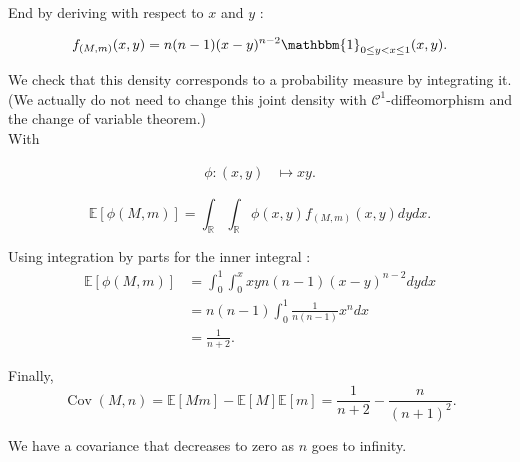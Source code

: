 End by deriving with respect to $x$ and $y$ :

$$f_{(M,m)}(x, y) = n (n-1) (x-y)^{n-2} \mathbbm{1}_{0\le y < x \le 1}(x, y).$$

We check that this density corresponds to a probability measure by integrating it.\\

(We actually do not need to change this joint density with $\mathcal{C}^1$-diffeomorphism and the change of variable theorem.)\\

With

\begin{align*}
  \phi \colon 
  (x,y) &\mapsto xy.
\end{align*}

$$\mathbb{E}[\phi(M,m)] = \displaystyle \int_{\mathbb{R}} \displaystyle \int_{\mathbb{R}} \phi(x,y)f_{(M,m)}(x, y) dy dx.$$

Using integration by parts for the inner integral : 
\begin{align*}
\mathbb{E}[\phi(M,m)] &= \displaystyle \int_0^1 \displaystyle \int_0^x xy n (n-1) (x-y)^{n-2} dy dx \\
&= n (n-1) \displaystyle \int_0^1 \frac1{n(n-1)} x^n dx\\
&=\frac1{n+2}.
\end{align*}

Finally, $$\operatorname{Cov}(M,n) = \mathbb{E}[Mm] - \mathbb{E}[M] \mathbb{E}[m] = \frac1{n+2} - \dfrac{n}{(n+1)^2}.$$

We have a covariance that decreases to zero as $n$ goes to infinity.